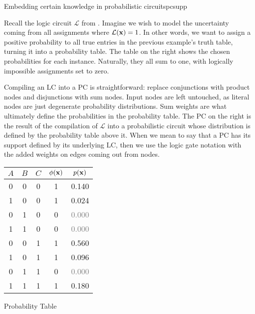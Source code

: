\begin{example}[sidebyside,lefthand width=0.55\textwidth]{Embedding certain knowledge in probabilistic circuits}{pcsupp}

  Recall the logic circuit $\mathcal{L}$ from . Imagine we wish to model the
  uncertainty coming from all assignments where $\mathcal{L}(\mathbf{x})=1$. In other words, we want
  to assign a positive probability to all true entries in the previous example's truth table,
  turning it into a probability table. The table on the right shows the chosen probabilities for
  each instance. Naturally, they all sum to one, with logically impossible assignments set to zero.

  Compiling an LC into a PC is straightforward: replace conjunctions with product nodes and
  disjunctions with sum nodes. Input nodes are left untouched, as literal nodes are just degenerate
  probability distributions. Sum weights are what ultimately define the probabilities in the
  probability table. The PC on the right is the result of the compilation of $\mathcal{L}$ into a
  probabilistic circuit whose distribution is defined by the probability table above it. When we
  mean to say that a PC has its support defined by its underlying LC, then we use the logic gate
  notation with the added weights on edges coming out from \inode{\newOrNode} nodes.

  \tcblower
  \small%
  \begin{center}
    \begin{tabular}{ccc|cc}
      \hline
      $A$ & $B$ & $C$ & $\phi(\mathbf{x})$ & $p(\mathbf{x})$\\
      \hline
      0 & 0 & 0 & 1 & 0.140\\
      1 & 0 & 0 & 1 & 0.024\\
      0 & 1 & 0 & 0 & \textcolor{gray}{0.000}\\
      1 & 1 & 0 & 0 & \textcolor{gray}{0.000}\\
      0 & 0 & 1 & 1 & 0.560\\
      1 & 0 & 1 & 1 & 0.096\\
      0 & 1 & 1 & 0 & \textcolor{gray}{0.000}\\
      1 & 1 & 1 & 1 & 0.180\\
      \hline
    \end{tabular}

    Probability Table


\end{center}
\end{example}
